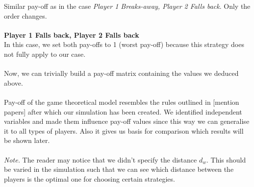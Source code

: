 \documentclass[10pt, a4paper]{report}
\begin{document}
Similar pay-off as in the case \textit{Player 1 Breaks-away, Player 2 Falls back}. Only the order changes.
\\\\
\textbf{Player 1 Falls back, Player 2 Falls back}
\\
In this case, we set both pay-offs to 1 (worst pay-off) because this strategy does not fully apply to our case.
\\\\
Now, we can trivially build a pay-off matrix containing the values we deduced above.\\\\
Pay-off of the game theoretical model resembles the rules outlined in [mention papers] after which our simulation has been created. We identified independent variables and made them influence pay-off values since this way we can generalise it to all types of players. Also it gives us basis for comparison which results will be shown later.\\\\
\textit{Note.} The reader may notice that we didn't specify the distance $d_w$. This should be varied in the simulation such that we can see which distance between the players is the optimal one for choosing certain strategies.
\end{document}
